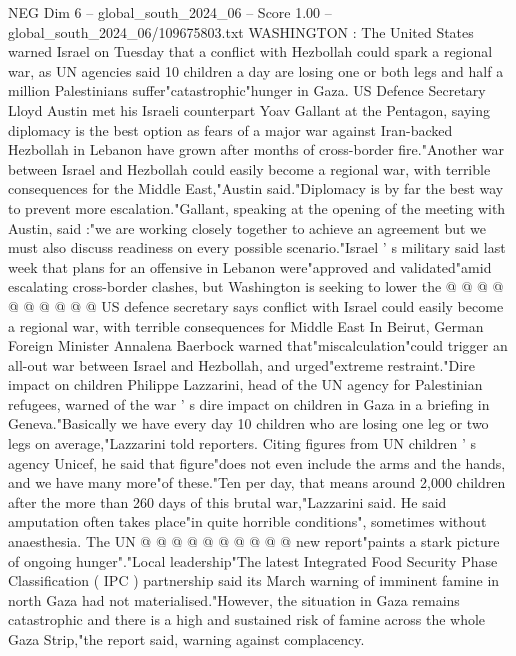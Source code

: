 \begin{textsample}{NEG Dim 6 – global\_south\_2024\_06 – Score 1.00 – global\_south\_2024\_06/109675803.txt}  \label{ex:f6_neg_268}
WASHINGTON : The United States warned Israel on Tuesday that a conflict with Hezbollah could spark a regional war, as UN agencies said 10 children a day are losing one or both legs and half a million Palestinians suffer"catastrophic"hunger in Gaza.
US Defence Secretary Lloyd Austin met his Israeli counterpart Yoav Gallant at the Pentagon, saying diplomacy is the best option as fears of a major war against Iran-backed Hezbollah in Lebanon have grown after months of cross-border fire."Another war between Israel and Hezbollah could easily become a regional war, with terrible consequences for the Middle East,"Austin said."Diplomacy is by far the best way to prevent more escalation."Gallant, speaking at the opening of the meeting with Austin, said :"we are working closely together to achieve an agreement but we must also discuss readiness on every possible scenario."Israel ' s military said last week that plans for an offensive in Lebanon were"approved and validated"amid escalating cross-border clashes, but Washington is seeking to lower the @ @ @ @ @ @ @ @ @ @ US defence secretary says conflict with Israel could easily become a regional war, with terrible consequences for Middle East In Beirut, German Foreign Minister Annalena Baerbock warned that"miscalculation"could trigger an all-out war between Israel and Hezbollah, and urged"extreme restraint."Dire impact on children Philippe Lazzarini, head of the UN agency for Palestinian refugees, warned of the war ' s dire impact on children in Gaza in a briefing in Geneva."Basically we have every day 10 children who are losing one leg or two legs on average,"Lazzarini told reporters.
Citing figures from UN children ' s agency Unicef, he said that figure"does not even include the arms and the hands, and we have many more"of these."Ten per day, that means around 2,000 children after the more than 260 days of this brutal war,"Lazzarini said.
He said amputation often takes place"in quite horrible conditions", sometimes without anaesthesia.
The UN @ @ @ @ @ @ @ @ @ @ new report"paints a stark picture of ongoing hunger"."Local leadership"The latest Integrated Food Security Phase Classification ( IPC ) partnership said its March warning of imminent famine in north Gaza had not materialised."However, the situation in Gaza remains catastrophic and there is a high and sustained risk of famine across the whole Gaza Strip,"the report said, warning against complacency.

\end{textsample}
